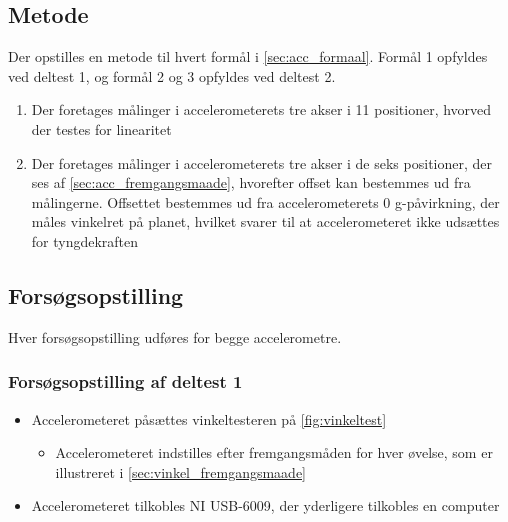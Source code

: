\subsection{Metode}
Der opstilles en metode til hvert formål i \autoref{sec:acc_formaal}. Formål 1 opfyldes ved deltest 1, og formål 2 og 3 opfyldes ved deltest 2.
\begin{enumerate}
\item Der foretages målinger i accelerometerets tre akser i 11 positioner, hvorved der testes for linearitet
\item Der foretages målinger i accelerometerets tre akser i de seks positioner, der ses af \autoref{sec:acc_fremgangsmaade}, hvorefter offset kan bestemmes ud fra målingerne. Offsettet bestemmes ud fra accelerometerets 0 g-påvirkning, der måles vinkelret på planet, hvilket svarer til at accelerometeret ikke udsættes for tyngdekraften
\end{enumerate}

\subsection{Forsøgsopstilling}
Hver forsøgsopstilling udføres for begge accelerometre.

\subsubsection{Forsøgsopstilling af deltest 1}
\begin{itemize}
\item Accelerometeret påsættes vinkeltesteren på \autoref{fig:vinkeltest}
\begin{itemize}
\item Accelerometeret indstilles efter fremgangsmåden for hver øvelse, som er illustreret i \autoref{sec:vinkel_fremgangsmaade}
\end{itemize}
\item Accelerometeret tilkobles NI USB-6009, der yderligere tilkobles en computer
\end{itemize}

